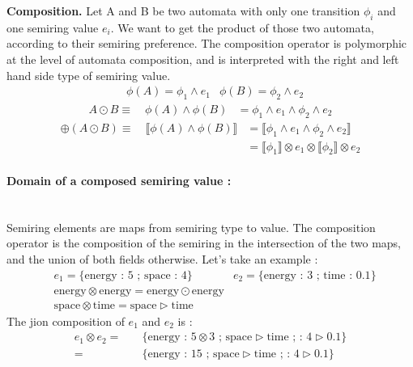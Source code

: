\documentclass{article}
\begin{document}
\textbf{Composition.} Let A and B be two automata with only one transition $\phi_i$ and one semiring value $e_i$. We want to get the product of those two automata, according to their semiring preference. The composition operator is polymorphic at the level of automata composition, and is interpreted with the right and left hand side type of semiring value. 
\begin{align*}
& \phi(A) =   \phi_1 \land e_1 
& \phi(B) =   \phi_2 \land e_2
\end{align*}
\begin{align*}
A \odot B \equiv \quad \phi(A) \land \phi(B) & = \phi_1 \land e_1 \land \phi_2 \land e_2
\end{align*}
\begin{align*}
\oplus (A \odot B) \equiv \quad \llbracket \phi(A) \land \phi(B) \rrbracket  & = \llbracket \phi_1 \land e_1 \land \phi_2\land e_2 \rrbracket \\
& = \llbracket \phi_1 \rrbracket \otimes e_1 \otimes \llbracket \phi_2 \rrbracket \otimes e_2 
\end{align*}

\paragraph{Domain of a composed semiring value :} \hspace{0pt} \\
Semiring elements are maps from semiring type to value. The composition operator is the composition of the semiring in the intersection of the two maps, and the union of both fields otherwise. Let's take an example :
\begin{align*}
& e_1 =   \{\text{energy : 5 ; space : 4}\} 
& e_2 =   \{\text{energy : 3 ; time : 0.1}\} \\
& \text{energy} \otimes \text{energy} = \text{energy} \odot \text{energy} \\
& \text{space} \otimes \text{time} = \text{space} \triangleright \text{time} 
\end{align*}
The jion composition of $e_1$ and $e_2$ is :
\begin{align*}
 e_1 \otimes e_2 = \quad  & \{\text{energy : } 5 \otimes 3 \text{ ; space}\triangleright \text{time ;  : 4} \triangleright \text{0.1}\} \\
 		= \quad & \{\text{energy : } 15 \text{ ; space}\triangleright \text{time ;  : 4} \triangleright \text{0.1}\}
\end{align*}
\end{document}
